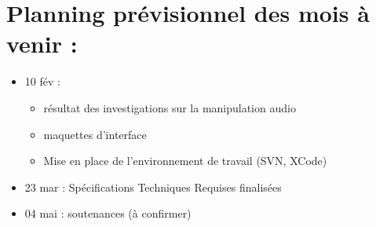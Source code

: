 \documentclass{scrartcl}
\begin{document}
\section{Planning prévisionnel des mois à venir :}

\begin{itemize}
  \item 10 fév  : 
  
  \begin{itemize}
		\item résultat des investigations sur la manipulation audio
		\item maquettes d’interface
		\item Mise en place de l’environnement de travail (SVN, XCode)
	\end{itemize}
  
  \item 23 mar : Spécifications Techniques Requises finalisées
  \item 04 mai : soutenances (à confirmer)
\end{itemize}
\end{document}
